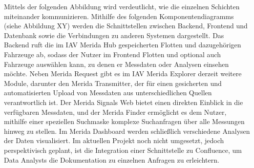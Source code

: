 Mittels der folgenden Abbildung wird verdeutlicht, wie die einzelnen Schichten miteinander kommunizieren.
\newline
\newline
Mithilfe des folgenden Komponentendiagramms (siehe Abbildung XY) werden die Schnittstellen zwischen Backend, Frontend und Datenbank sowie die Verbindungen zu anderen Systemen dargestellt. Das Backend ruft die im IAV Merida Hub gespeicherten Flotten und dazugehörigen Fahrzeuge ab, sodass der Nutzer im Frontend Flotten und optional auch Fahrzeuge auswählen kann, zu denen er Messdaten oder Analysen einsehen möchte.
\newline
Neben Merida Request gibt es im IAV Merida Explorer derzeit weitere Module, darunter den Merida Transmitter, der für einen gesicherten und automatisierten Upload von Messdaten aus unterschiedlichen Quellen verantwortlich ist. Der Merida Signals Web bietet einen direkten Einblick in die verfügbaren Messdaten, und der Merida Finder ermöglicht es dem Nutzer, mithilfe einer speziellen Suchmaske komplexe Suchanfragen über alle Messungen hinweg zu stellen. Im Merida Dashboard werden schließlich verschiedene Analysen der Daten visualisiert.
\newline
Im aktuellen Projekt noch nicht umgesetzt, jedoch perspektivisch geplant, ist die Integration einer Schnittstelle zu Confluence, um Data Analysts die Dokumentation zu einzelnen Anfragen zu erleichtern.
\label{chap:kapitel5}